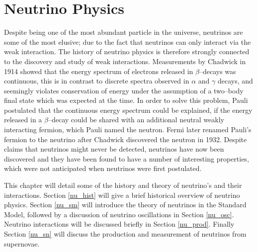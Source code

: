 \chapter{\label{ch:neutrinophysics}Neutrino Physics} 


 

\minitoc

Despite being one of the most abundant particle in the universe, neutrinos are 
some of the most elusive; due to the fact that neutrinos can only interact via
the weak interaction. The history of neutrino physics is therefore strongly
connected to the discovery and study of weak interactions. Measurements by
Chadwick in 1914 showed that the energy spectrum of electrons released in
$\beta$--decays was continuous, this is in contrast to discrete spectra
observed in $\alpha$ and $\gamma$ decays, and seemingly violates
conservation of energy under the assumption of a two--body final state which was
expected at the time. In order to solve this problem, Pauli postulated that the 
continuous energy spectrum could be explained, if the energy released in a 
$\beta$--decay could be shared with an additional neutral weakly interacting 
fermion, which Pauli named the neutron. Fermi later renamed Pauli's fermion to 
the neutrino after Chadwick discovered the neutron in 1932. Despite claims that 
neutrinos might never be detected, neutrinos have now been discovered and they 
have been found to have a number of interesting properties, which were not 
anticipated when neutrinos were first postulated. 

This chapter will detail some of the history and theory of neutrino's and their 
interactions. Section \ref{nu_hist} will give a brief historical overview of 
neutrino physics. Section \ref{nu_sm} will introduce the theory of neutrinos 
in the Standard Model, followed by a discussion of neutrino oscillations in 
Section \ref{nu_osc}. Neutrino interactions will be discussed briefly in 
Section \ref{nu_prod}. Finally Section \ref{nu_sn} will discuss the production 
and measurement of neutrinos from supernovae.

